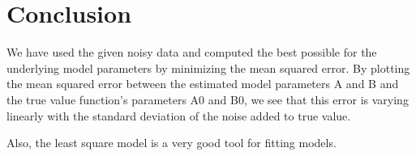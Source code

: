 \documentclass[11pt, a4paper]{article}
\begin{document}
\section{Conclusion}
We have used the given noisy data and computed the best possible for the underlying model parameters by minimizing the mean squared error. By plotting the mean squared error between the estimated model parameters A and B and the true value function's parameters A0 and B0, we see that this error is varying linearly with the standard deviation of the noise added to true value.

Also, the least square model is a very good tool for fitting models.
\end{document}
